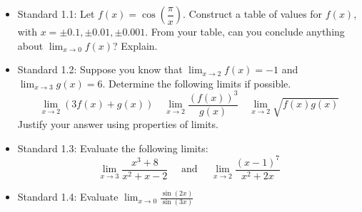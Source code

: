 \documentclass[11pt]{beamer}
\newcommand{\di}{\displaystyle}
\begin{document}


\begin{frame}
\begin{itemize}
\item Standard 1.1: Let $f(x)=\cos\left(\dfrac{\pi}{x}\right)$. Construct a table of values for $f(x)$, with $x=\pm 0.1, \pm 0.01, \pm 0.001$. From your table, can you conclude anything about $\di\lim_{x\to 0}f(x)$? Explain.

\item Standard 1.2: Suppose you know that $\di \lim_{x\to 2}f(x)=-1$ and $\di \lim_{x\to 3}g(x)=6$. Determine the following limits if possible. 
\[
\lim_{x\to 2}(3f(x)+g(x))\quad \lim_{x\to 2}\frac{(f(x))^3}{g(x)} \quad \lim_{x\to 2}\sqrt{f(x)g(x)}
\]
Justify your answer using properties of limits.
\item Standard 1.3: Evaluate the following limits:
\[
\lim_{x\to 3}\frac{x^3+8}{x^2+x-2} \quad \text{ and } \quad \lim_{x\to 2}\frac{(x-1)^7}{x^2+2x}
\]
\item Standard 1.4: Evaluate $\di\lim_{x\to 0}\frac{\sin(2x)}{\sin(3x)}$
\end{itemize}
\end{frame}
\end{document}
